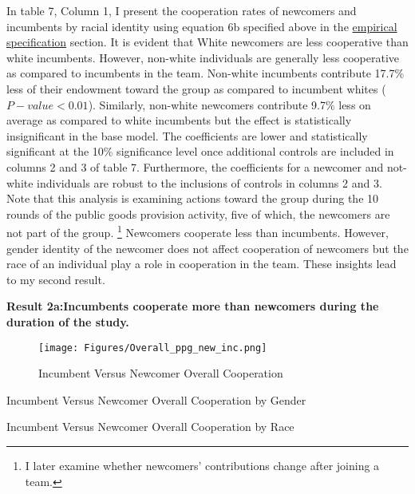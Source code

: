 In table 7, Column 1, I present the cooperation rates of  newcomers and incumbents by racial identity using equation 6b specified above in the \hyperref[subsec:Specification]{empirical specification} section. It is evident that White newcomers are less cooperative than white incumbents. However, non-white individuals are generally less cooperative as compared to incumbents in the team. Non-white incumbents contribute 17.7\% less of their endowment toward the group as compared to incumbent whites ($P-value<0.01$). Similarly, non-white newcomers contribute 9.7\% less on average as compared to white incumbents but the effect is statistically insignificant in the base model. The coefficients are lower and statistically significant at the 10\% significance level once additional controls are included in columns 2 and 3 of table 7. Furthermore, the coefficients for a newcomer and not-white individuals are robust to the inclusions of controls in columns 2 and 3.  Note that this analysis is examining actions toward the group during the 10 rounds of the public goods provision activity, five of which, the newcomers are not part of the group. \footnote{I later examine whether newcomers' contributions change after joining a team.} Newcomers cooperate less than incumbents. However, gender identity of the newcomer does not affect cooperation of newcomers but the race of an individual play a role in cooperation in the team. These insights lead to my second result.

\textbf{Result 2a:Incumbents cooperate more than newcomers during the duration of the study. }

\begin{figure}[H]
 \captionsetup{justification=raggedright,singlelinecheck=false}
\caption{Incumbent Versus Newcomer Overall Cooperation}
\texttt{[image: Figures/Overall\_ppg\_new\_inc.png]} 
\end{figure}

\begin{table}[H]
 \captionsetup{justification=raggedright,singlelinecheck=false}
\caption{Incumbent Versus Newcomer Overall Cooperation  by Gender} \label{tab:table4}
    \begin{center}
        
    \end{center}
\end{table}


\begin{table}[H]
 \captionsetup{justification=raggedright,singlelinecheck=false}
\caption{Incumbent Versus Newcomer Overall Cooperation by Race} \label{tab:table4}
    \begin{center}
        
    \end{center}
\end{table}


